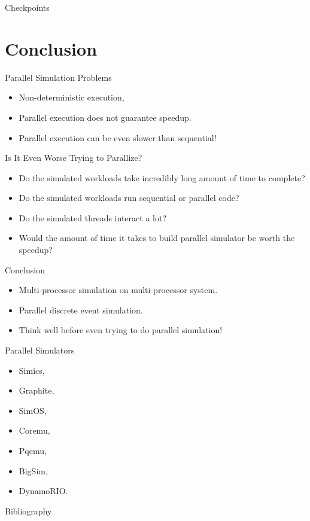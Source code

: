 \begin{frame}{Checkpoints}
  \centering
\end{frame}

\section*{Conclusion}

\begin{frame}{Parallel Simulation Problems}
  \begin{itemize}
    \item Non-deterministic execution,
    \item Parallel execution does not guarantee speedup. \pause
    \item Parallel execution can be even slower than sequential!
  \end{itemize}
\end{frame}

\begin{frame}{Is It Even Worse Trying to Parallize?}
  \begin{itemize}
    \item Do the simulated workloads take incredibly long amount of time to
      complete?
    \item Do the simulated workloads run sequential or parallel code?
    \item Do the simulated threads interact a lot? \pause
    \item Would the amount of time it takes to build parallel simulator be
      worth the speedup?
  \end{itemize}
\end{frame}

\begin{frame}{Conclusion}
  \begin{itemize}
    \item Multi-processor simulation on multi-processor system.
    \item Parallel discrete event simulation. \pause
    \item Think well before even trying to do parallel simulation!
  \end{itemize}
\end{frame}

\begin{frame}{Parallel Simulators}
  \begin{itemize}
    \item Simics,
    \item Graphite,
    \item SimOS,
    \item Coremu,
    \item Pqemu,
    \item BigSim,
    \item DynamoRIO.
  \end{itemize}
\end{frame}

\begin{frame}[allowframebreaks]{Bibliography}
  \nocite{gharachorloo-memory-consistency}
  \nocite{ding-pqemu}
  \nocite{fujimoto-pdes}
  \nocite{liu-pdes}
  \nocite{misra-ddes}
  \printbibliography
\end{frame}

\finalslide


